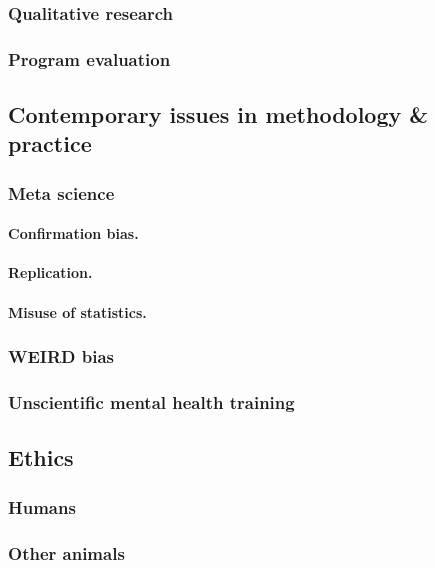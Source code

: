 \documentclass[oneside]{book}
\numberwithin{equation}{section}
\begin{document}
\subsubsection{Qualitative research}

\subsubsection{Program evaluation}

\subsection{Contemporary issues in methodology \& practice}

\subsubsection{Meta science}

\paragraph{Confirmation bias.}

\paragraph{Replication.}

\paragraph{Misuse of statistics.}

\subsubsection{WEIRD bias}

\subsubsection{Unscientific mental health training}

\subsection{Ethics}

\subsubsection{Humans}

\subsubsection{Other animals}
\end{document}
